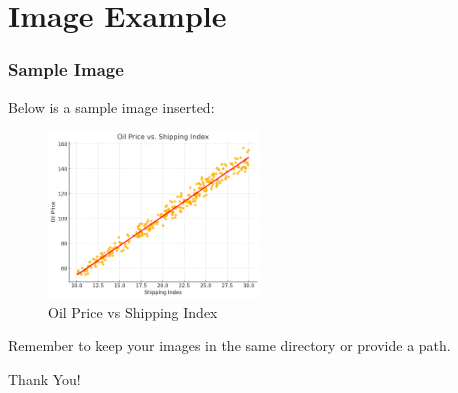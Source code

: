 \documentclass[16pt]{beamer}
\begin{document}
\section{Image Example}
\begin{frame}
  \frametitle{Sample Image}

  Below is a sample image inserted:

  \begin{figure}[h!]
    \centering
    \includegraphics[width=0.5\textwidth]{Oil_price_vs_Shipping_index.png} %
    \caption{Oil Price vs Shipping Index}
  \end{figure}

  Remember to keep your images in the same directory or provide a path.
\end{frame}

\begin{frame}
  \centering
  \Huge Thank You!
\end{frame}
\end{document}
